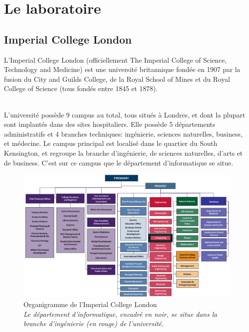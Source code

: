 \documentclass[10pt]{report}
\begin{document}
	\section{Le laboratoire}
	
	\subsection{Imperial College London} 
	L’Imperial College London (officiellement The Imperial College of Science, Technology and Medicine) est une université britannique fondée en 1907 par la fusion du City and Guilds College, de la Royal School of Mines et du Royal College of Science (tous fondés entre 1845 et 1878).\\ ~\par
    L'université possède 9 campus au total, tous situés à Londres, et dont la plupart sont implantés dans des sites hospitaliers.  
    Elle possède 5 départements administratifs et 4 branches techniques: ingénierie, sciences naturelles, business, et médecine.	Le campus principal est localisé dans le quartier du South Kensington, et regroupe la branche d'ingénierie, de sciences naturelles, d'arts et de business. C'est sur ce campus que le département d'informatique se situe. 
    
	\begin{figure}[h!]
		\begin{center}
			\includegraphics[width=17cm]{Reports/figures/College-Organisation.pdf}
		\end{center}
		\caption[Organigramme de l'Imperial College London]{Organigramme de l'Imperial College London \\ \textit{Le département d'informatique, encadré en noir, se situe dans la branche d'ingénierie (en rouge) de l'université.}}
		\label{Organigramme de l'Imperial College London}
	\end{figure}
	
\end{document}
